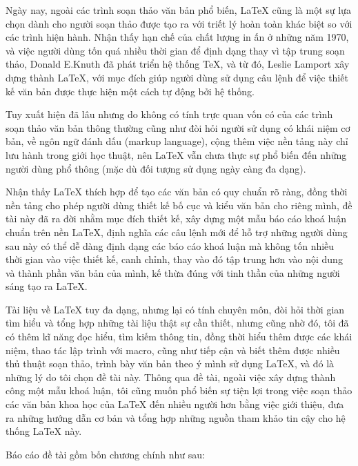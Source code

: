 \startintroduction
\fancyhead[L]{}
Ngày nay, ngoài các trình soạn thảo văn bản phổ biến, LaTeX cũng là một sự lựa chọn dành cho người soạn thảo được
tạo ra với triết lý hoàn toàn khác biệt so với các trình hiện hành. Nhận thấy hạn chế của chất lượng in ấn ở những
năm 1970, và việc người dùng tốn quá nhiều thời gian để định dạng thay vì tập trung soạn thảo, Donald E.Knuth đã phát
triển hệ thống TeX, và từ đó, Leslie Lamport xây dựng thành LaTeX, với mục đích giúp người dùng sử dụng câu
lệnh để việc thiết kế văn bản được thực hiện một cách tự động bởi hệ thống. \par 
Tuy xuất hiện đã lâu nhưng do không có tính trực quan vốn có của các trình soạn thảo văn bản thông thường cũng như đòi hỏi người sử dụng có khái niệm cơ bản, 
về ngôn ngữ đánh dấu (markup language), cộng thêm việc nền tảng này chỉ lưu hành trong giới học thuật, nên LaTeX vẫn
chưa thực sự phổ biến đến những người dùng phổ thông (mặc dù đối tượng sử dụng ngày càng đa dạng).\par
Nhận thấy LaTeX thích hợp để tạo các văn bản có quy chuẩn rõ ràng, đồng thời nền tảng cho phép người dùng thiết kế bố cục và kiểu văn bản
cho riêng mình, đề tài này đã ra đời nhằm mục đích thiết kế, xây dựng một mẫu báo cáo khoá luận chuẩn trên nền LaTeX, định nghĩa các câu lệnh
mới để hỗ trợ những người dùng sau này có thể dễ dàng định dạng các báo cáo khoá luận mà không tốn nhiều thời gian vào việc thiết kế, canh chỉnh, thay vào đó
tập trung hơn vào nội dung và thành phần văn bản của mình, kế thừa đúng với tinh thần của những người sáng tạo ra LaTeX.\par
Tài liệu về LaTeX tuy đa dạng, nhưng lại có tính chuyên môn, đòi hỏi thời gian tìm hiểu và tổng hợp những tài liệu thật sự cần thiết, nhưng cũng nhờ
đó, tôi đã có thêm kĩ năng đọc hiểu, tìm kiếm thông tin, đồng thời hiểu thêm được các khái niệm, thao tác lập trình với
macro, cũng như tiếp cận và biết thêm được nhiều thủ thuật soạn thảo, trình bày văn bản theo ý mình sử dụng LaTeX, và đó
là những lý do tôi chọn đề tài này. Thông qua đề tài, ngoài việc xây dựng thành công một mẫu khoá luận, tôi cũng
muốn phổ biến sự tiện lợi trong việc soạn thảo các văn bản khoa học của LaTeX đến nhiều người hơn bằng việc giới thiệu, đưa
ra những hướng dẫn cơ bản và tổng hợp những nguồn tham khảo tin cậy cho hệ thống LaTeX này.\par
Báo cáo đề tài gồm bốn chương chính như sau:\par
\clearpage 

